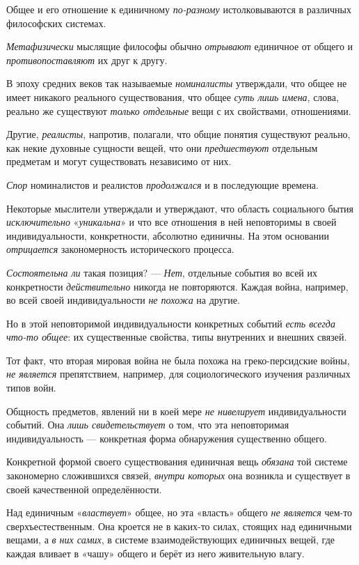 \documentclass[a4paper,14pt,russian]{extreport}
\begin{document}
Общее и его отношение к единичному \emph{по-разному} истолковываются в различных философских системах.

\emph{Метафизически} мыслящие философы обычно \emph{отрывают} единичное от общего и \emph{противопоставляют} их друг к другу.

В эпоху средних веков так называемые \emph{номиналисты} утверждали, что общее не имеет никакого реального существования, что общее \emph{суть лишь имена}, слова, реально же существуют \emph{только отдельные} вещи с их свойствами, отношениями.

Другие, \emph{реалисты}, напротив, полагали, что общие понятия существуют реально, как некие духовные сущности вещей, что они \emph{предшествуют} отдельным предметам и могут существовать независимо от них.

\emph{Спор} номиналистов и реалистов \emph{продолжался} и в последующие времена.

Некоторые мыслители утверждали и утверждают, что область социального бытия \emph{исключительно} «\emph{уникальна}» и что все отношения в ней неповторимы в своей индивидуальности, конкретности, абсолютно единичны. На этом основании \emph{отрицается} закономерность исторического процесса.

\emph{Состоятельна ли} такая позиция? --- \emph{Нет}, отдельные события во всей их конкретности \emph{действительно} никогда не повторяются. Каждая война, например, во всей своей индивидуальности \emph{не похожа} на другие.

Но в этой неповторимой индивидуальности конкретных событий \emph{есть всегда что-то общее}: их существенные свойства, типы внутренних и внешних связей.

Тот факт, что вторая мировая война не была похожа на греко-персидские войны, \emph{не является} препятствием, например, для социологического изучения различных типов войн.

Общность предметов, явлений ни в коей мере \emph{не нивелирует} индивидуальности событий. Она \emph{лишь свидетельствует} о том, что эта неповторимая индивидуальность --- конкретная форма обнаружения существенно общего.

Конкретной формой своего существования единичная вещь \emph{обязана} той системе закономерно сложившихся связей, \emph{внутри которых} она возникла и существует в своей качественной определённости.

Над единичным «\emph{властвует}» общее, но эта «власть» общего \emph{не является} чем-то сверхъестественным. Она кроется не в каких-то силах, стоящих над единичными вещами, а \emph{в них самих}, в системе взаимодействующих единичных вещей, где каждая вливает в «чашу» общего и берёт из него живительную влагу.
\end{document}
